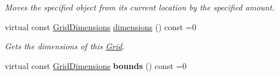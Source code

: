 \begin{DoxyCompactItemize}
\begin{DoxyCompactList}\small\item\em Moves the specified object from its current location by the specified amount. \end{DoxyCompactList}\item 
virtual const \hyperlink{classrepast_1_1_grid_dimensions}{Grid\-Dimensions} \hyperlink{classrepast_1_1_grid_ac6a979a6491565212ae44b8bfbbc9393}{dimensions} () const =0
\begin{DoxyCompactList}\small\item\em Gets the dimensions of this \hyperlink{classrepast_1_1_grid}{Grid}. \end{DoxyCompactList}\item 
\hypertarget{classrepast_1_1_grid_afe975f7aa1ba40dafaefebf67b118f9e}{virtual const \hyperlink{classrepast_1_1_grid_dimensions}{Grid\-Dimensions} {\bfseries bounds} () const =0}\label{classrepast_1_1_grid_afe975f7aa1ba40dafaefebf67b118f9e}


\end{DoxyCompactItemize}
